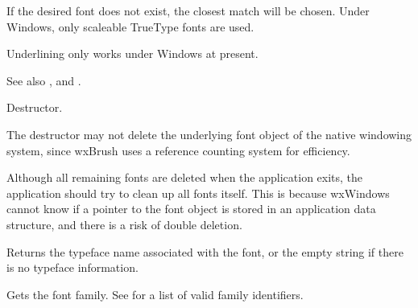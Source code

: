 


If the desired font does not exist, the closest match will be chosen.
Under Windows, only scaleable TrueType fonts are used.

Underlining only works under Windows at present.

See also , 
and .



Destructor.


The destructor may not delete the underlying font object of the native windowing
system, since wxBrush uses a reference counting system for efficiency.

Although all remaining fonts are deleted when the application exits,
the application should try to clean up all fonts itself. This is because
wxWindows cannot know if a pointer to the font object is stored in an
application data structure, and there is a risk of double deletion.

\label{wxfontgetfacename}


Returns the typeface name associated with the font, or the empty string if there is no
typeface information.



\label{wxfontgetfamily}


Gets the font family. See  for a list of valid
family identifiers.



\label{wxfontgetfontid}

